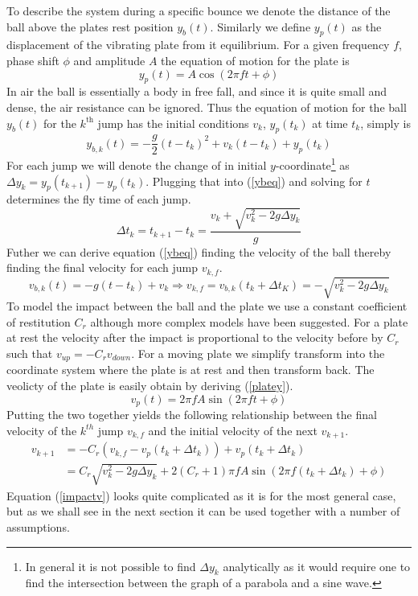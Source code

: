 \documentclass[12pt,oneside,a4paper]{article}
\numberwithin{equation}{section}
\begin{document}
{{{{To describe the system during a specific bounce we denote the distance of the ball above the plates rest position $y_b(t)$. Similarly we define $y_p(t)$ as the displacement of the vibrating  plate from it equilibrium. For a given frequency $f$, phase shift $\phi$ and amplitude $A$ the equation of motion for the plate is
\begin{equation}
	y_p(t)= A \cos(2\pi f t+ \phi)
	\label{platey}
\end{equation}
In air the ball is essentially a body in free fall, and since it is quite small and dense, the air resistance can be ignored. Thus the equation of motion for the ball $y_b(t)$ for the $k^\text{th}$ jump has the initial conditions $v_k$, $y_p(t_k)$ at time $t_k$, simply is
\begin{equation}
	y_{b,k}(t) = -\frac{g}{2}(t-t_k)^2+v_k(t-t_k)+y_p(t_k)
	\label{ybeq}
\end{equation}
For each jump we will denote the change of in initial $y$-coordinate\footnote{In general it is not possible to find $\Delta y_k$ analytically as it would require one to find the intersection between the graph of a parabola and a sine wave.} as $\Delta y_{k}=y_p(t_{k+1})-y_p(t_{k})$. Plugging that into (\ref{ybeq}) and solving for $t$ determines the fly time of each jump.
\begin{equation}
	\Delta t_{k} = t_{k+1}-t_{k} = \frac{v_{k}+\sqrt{v_k^2-2g\Delta y_k}}{g}
	\label{flytime}
\end{equation}
Futher we can derive equation (\ref{ybeq}) finding the velocity of the ball thereby finding the final velocity for each jump $v_{k,f}$.
\begin{equation}
	v_{b,k}(t) = -g(t-t_k)+v_k \Rightarrow v_{k,f} = v_{b,k}(t_k+\Delta t_K) = -\sqrt{v_k^2-2g\Delta y_k}
\end{equation}
To model the impact between the ball and the plate we use a constant coefficient of restitution $C_r$ although more complex models have been suggested. For a plate at rest the velocity after the impact is proportional to the velocity before by $C_r$ such that $v_{up}=-C_r v_{down}$. For a moving plate we simplify transform into the coordinate system where the plate is at rest and then transform back. The veolicty of the plate is easily obtain by deriving (\ref{platey}).
\begin{equation}
	v_p(t) = 2\pi f A \sin(2\pi f t+ \phi)
\end{equation}
Putting the two together yields the following relationship between the final velocity of the $k^{th}$ jump $v_{k,f}$ and the initial velocity of the next $v_{k+1}$.
\begin{align}
	v_{k+1} &= -C_r(v_{k,f}-v_p(t_k+\Delta t_k))+v_p(t_k+\Delta t_k) \nonumber \\
	&= C_r \sqrt{v_k^2-2g\Delta y_k}+2(C_r+1)\pi f A \sin(2\pi f (t_k+\Delta t_k)+ \phi) \label{impactv}
\end{align}
Equation (\ref{impactv}) looks quite complicated as it is for the most general case, but as we shall see in the next section it can be used together with a number of assumptions.

}}}}
\end{document}
